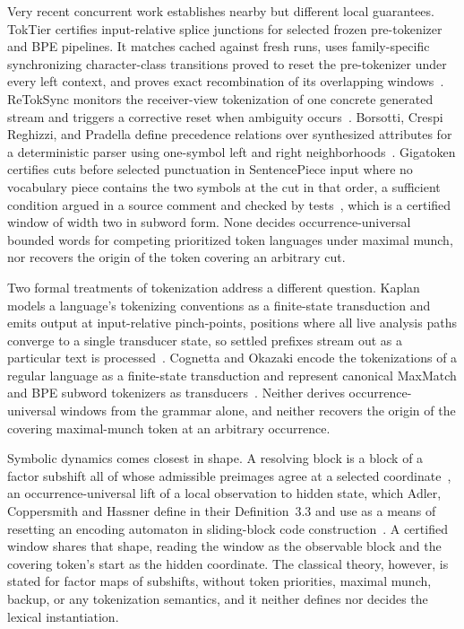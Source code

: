 \documentclass[11pt,a4paper]{article}
\theoremstyle{definition}
\theoremstyle{plain}
\begin{document}
Very recent concurrent work establishes nearby but different local guarantees. TokTier certifies input-relative splice
junctions for selected frozen pre-tokenizer and BPE pipelines. It matches cached against fresh runs, uses
family-specific synchronizing character-class transitions proved to reset the pre-tokenizer under every left context,
and proves exact recombination of its overlapping windows~\cite{zhang2026toktier}. ReTokSync monitors the receiver-view
tokenization of one concrete generated stream and triggers a corrective reset when ambiguity
occurs~\cite{wang2026retoksync}. Borsotti, Crespi Reghizzi, and Pradella define precedence relations over synthesized
attributes for a deterministic parser using one-symbol left and right neighborhoods~\cite{borsotti2026attribute}.
Gigatoken certifies cuts before selected punctuation in SentencePiece input where no vocabulary piece contains the two
symbols at the cut in that order, a sufficient condition argued in a source comment and checked by
tests~\cite{rod2026gigatoken}, which is a certified window of width two in subword form. None decides
occurrence-universal bounded words for competing prioritized token languages under maximal munch, nor recovers the
origin of the token covering an arbitrary cut.

Two formal treatments of tokenization address a different question. Kaplan models a language's tokenizing conventions as
a finite-state transduction and emits output at input-relative pinch-points, positions where all live analysis paths
converge to a single transducer state, so settled prefixes stream out as a particular text is
processed~\cite{kaplan2005tokenizing}. Cognetta and Okazaki encode the tokenizations of a regular language as a
finite-state transduction and represent canonical MaxMatch and BPE subword tokenizers as
transducers~\cite{cognetta2025fst}. Neither derives occurrence-universal windows from the grammar alone, and neither
recovers the origin of the covering maximal-munch token at an arbitrary occurrence.

Symbolic dynamics comes closest in shape. A resolving block is a block of a factor subshift all of whose admissible
preimages agree at a selected coordinate~\cite{adler1983sliding, marcus1985sofic}, an occurrence-universal lift of a
local observation to hidden state, which Adler, Coppersmith and Hassner define in their Definition~3.3 and use as a
means of resetting an encoding automaton in sliding-block code construction~\cite[Definition~3.3]{adler1983sliding}. A
certified window shares that shape, reading the window as the observable block and the covering token's start as the
hidden coordinate. The classical theory, however, is stated for factor maps of subshifts, without token priorities,
maximal munch, backup, or any tokenization semantics, and it neither defines nor decides the lexical instantiation.
\end{document}
